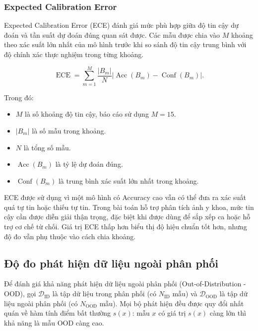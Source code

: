 \subsubsection{Expected Calibration Error}

Expected Calibration Error (ECE) \cite{Guo2017Calibration} đánh giá mức phù hợp giữa độ tin cậy dự đoán và tần suất dự đoán đúng quan sát được. Các mẫu được chia vào $M$ khoảng theo xác suất lớn nhất của mô hình trước khi so sánh độ tin cậy trung bình với độ chính xác thực nghiệm trong từng khoảng.

\begin{equation}\operatorname{ECE}=\sum_{m=1}^{M}\frac{|B_m|}{N}\left|\operatorname{Acc}(B_m)-\operatorname{Conf}(B_m)\right|.\label{eq:ch4_ece}\end{equation}

Trong đó:
\begin{itemize}
    \item $M$ là số khoảng độ tin cậy, báo cáo sử dụng $M=15$.
    \item $|B_m|$ là số mẫu trong khoảng.
    \item $N$ là tổng số mẫu.
    \item $\operatorname{Acc}(B_m)$ là tỷ lệ dự đoán đúng.
    \item $\operatorname{Conf}(B_m)$ là trung bình xác suất lớn nhất trong khoảng.
\end{itemize}

ECE được sử dụng vì một mô hình có Accuracy cao vẫn có thể đưa ra xác suất quá tự tin hoặc thiếu tự tin. Trong bài toán hỗ trợ phân tích ảnh y khoa, mức tin cậy cần được diễn giải thận trọng, đặc biệt khi được dùng để sắp xếp ca hoặc hỗ trợ cơ chế từ chối. Giá trị ECE thấp hơn biểu thị độ hiệu chuẩn tốt hơn, nhưng độ đo vẫn phụ thuộc vào cách chia khoảng.

\subsection{Độ đo phát hiện dữ liệu ngoài phân phối}

Để đánh giá khả năng phát hiện dữ liệu ngoài phân phối (Out-of-Distribution - OOD), gọi $\mathcal{D}_{\mathrm{ID}}$ là tập dữ liệu trong phân phối (có $N_{\mathrm{ID}}$ mẫu) và $\mathcal{D}_{\mathrm{OOD}}$ là tập dữ liệu ngoài phân phối (có $N_{\mathrm{OOD}}$ mẫu). Mọi bộ phát hiện đều được quy đổi nhất quán về hàm tính điểm bất thường $s(x)$: mẫu $x$ có giá trị $s(x)$ càng lớn thì khả năng là mẫu OOD càng cao.

